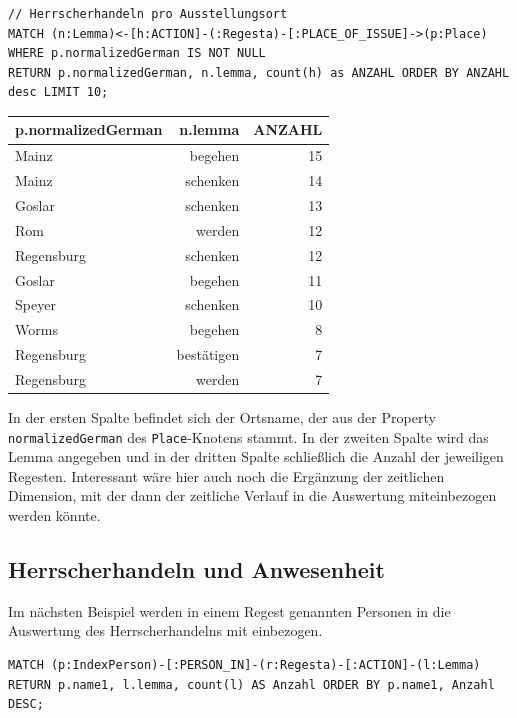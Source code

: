 \documentclass[ngerman,]{scrreprt}
\begin{document}
\begin{verbatim}
// Herrscherhandeln pro Ausstellungsort
MATCH (n:Lemma)<-[h:ACTION]-(:Regesta)-[:PLACE_OF_ISSUE]->(p:Place)
WHERE p.normalizedGerman IS NOT NULL
RETURN p.normalizedGerman, n.lemma, count(h) as ANZAHL ORDER BY ANZAHL desc LIMIT 10;
\end{verbatim}

\begin{longtable}[]{@{}lrr@{}}
\toprule
p.normalizedGerman & n.lemma & ANZAHL\tabularnewline
\midrule
\endhead
Mainz & begehen & 15\tabularnewline
Mainz & schenken & 14\tabularnewline
Goslar & schenken & 13\tabularnewline
Rom & werden & 12\tabularnewline
Regensburg & schenken & 12\tabularnewline
Goslar & begehen & 11\tabularnewline
Speyer & schenken & 10\tabularnewline
Worms & begehen & 8\tabularnewline
Regensburg & bestätigen & 7\tabularnewline
Regensburg & werden & 7\tabularnewline
\bottomrule
\end{longtable}

In der ersten Spalte befindet sich der Ortsname, der aus der Property \texttt{normalizedGerman} des \texttt{Place}-Knotens stammt. In der zweiten Spalte wird das Lemma angegeben und in der dritten Spalte schließlich die Anzahl der jeweiligen Regesten. Interessant wäre hier auch noch die Ergänzung der zeitlichen Dimension, mit der dann der zeitliche Verlauf in die Auswertung miteinbezogen werden könnte.

\hypertarget{herrscherhandeln-und-anwesenheit}{%
\subsection{Herrscherhandeln und Anwesenheit}\label{herrscherhandeln-und-anwesenheit}}

Im nächsten Beispiel werden in einem Regest genannten Personen in die Auswertung des Herrscherhandelns mit einbezogen.

\begin{verbatim}
MATCH (p:IndexPerson)-[:PERSON_IN]-(r:Regesta)-[:ACTION]-(l:Lemma)
RETURN p.name1, l.lemma, count(l) AS Anzahl ORDER BY p.name1, Anzahl DESC;
\end{verbatim}
\end{document}
